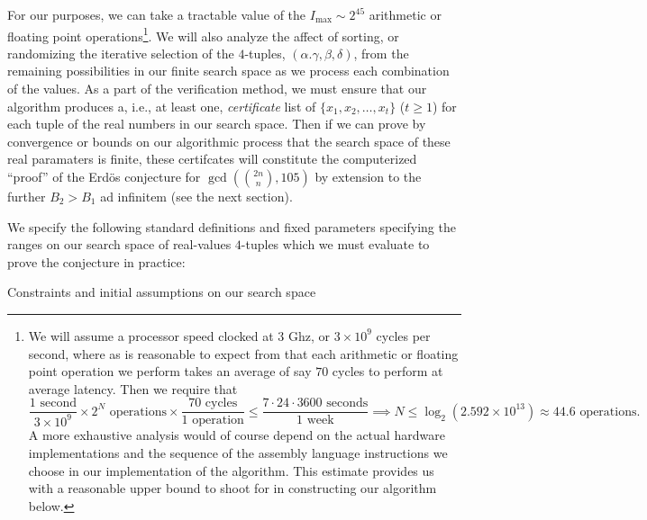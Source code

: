 \documentclass[12pt]{article}
\begin{document}
For our purposes, we can take a tractable value of the $I_{\max} \sim 2^{45}$ arithmetic or floating point 
operations\footnote{ 
     We will assume a processor speed clocked at 3 Ghz, or $3 \times 10^9$ cycles per second, 
     where as is reasonable to expect from 
     \cite{INST-TABLES-REF} that each arithmetic or floating point operation we perform takes an 
     average of say $70$ cycles to perform at average latency. Then we require that 
     \[
     \frac{1\text{ second}}{3 \times 10^9} \times 2^N \text{ operations} \times 
          \frac{70\text{ cycles}}{1\text{ operation}} \leq \frac{7 \cdot 24 \cdot 3600 \text{ seconds}}{ 
          1\text{ week}} \implies 
          N \leq \log_2(2.592 \times 10^{13}) \approx 44.6 \text{ operations}. 
     \] 
     A more exhaustive analysis would of course depend on the actual hardware implementations and the 
     sequence of the assembly language instructions we choose in our implementation of the 
     algorithm. This estimate provides us with a reasonable upper bound to shoot for in 
     constructing our algorithm below. 
}. We will also analyze the affect of sorting, or randomizing the iterative selection of the 
$4$-tuples, $(\alpha.\gamma,\beta,\delta)$, from the remaining possibilities in our finite search space 
as we process each combination of the values. As a part of the verification method, we must ensure that 
our algorithm produces a, i.e., at least one, 
\emph{certificate} list of $\{x_1,x_2,\ldots,x_t\}$ ($t \geq 1$) for each tuple of the real numbers in 
our search space. Then if we can prove by convergence or bounds on our algorithmic process that the 
search space of these real paramaters is finite, these certifcates will constitute the 
computerized ``proof'' of the Erd\"os conjecture for $\gcd(\binom{2n}{n}, 105)$ by extension to the 
further $B_2 > B_1$ ad infinitem (see the next section). 

We specify the following standard definitions and fixed parameters specifying the ranges on our 
search space of real-values $4$-tuples which we must evaluate to prove the conjecture in 
practice: 
\begin{algorithm}[H] 
     \SetAlgoLined
     \BlankLine
     \caption{Constraints and initial assumptions on our search space} 
\end{algorithm} 
\end{document}

